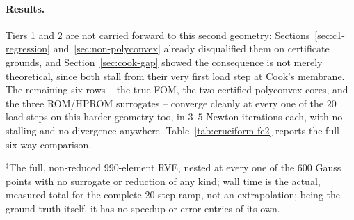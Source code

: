 \documentclass[10pt,a4paper]{article}
\begin{document}
\paragraph{Results.} Tiers 1 and 2 are not carried forward to this second
geometry: Sections~\ref{sec:c1-regression} and~\ref{sec:non-polyconvex}
already disqualified them on certificate grounds, and
Section~\ref{sec:cook-gap} showed the consequence is not merely
theoretical, since both stall from their very first load step at Cook's
membrane. The remaining six rows -- the true FOM, the two certified
polyconvex cores, and the three ROM/HPROM surrogates -- converge cleanly
at every one of the $20$ load steps on this harder geometry too, in
$3$--$5$ Newton iterations each, with no stalling and no divergence
anywhere. Table~\ref{tab:cruciform-fe2} reports the full six-way
comparison.

\begin{table}[H]
\centering
\caption{Cruciform specimen at $n_{\rm body}=6$ ($200$ elements, $600$ Gauss
points), full $20$-step ramp, every model this paper carries forward as a
macroscopic material law after Sections~\ref{sec:c1-regression}--\ref{sec:cook}
disqualify tiers 1--2 (Table~\ref{tab:cook-fe2} still reports both), plus
the true, non-reduced FE$^2$ solve
(first row, FOM-FE$^2$) nested the same way at every Gauss point. Tip
reaction-force $F_x$ is the total force at the pulled tip; $S$ err.\ is the
relative $L^2$ error of the full $600$-Gauss-point final-state stress
field, the energy-conjugate (reaction-force) convention throughout (Setup
paragraph above).}
\label{tab:cruciform-fe2}
\footnotesize
{}

\vspace{4pt}
\footnotesize $^\ddagger$The full, non-reduced $990$-element RVE, nested
at every one of the $600$ Gauss points with no surrogate or reduction of
any kind; wall time is the actual, measured total for the complete
$20$-step ramp, not an extrapolation; being the ground truth itself, it
has no speedup or error entries of its own.
\end{table}
\end{document}
